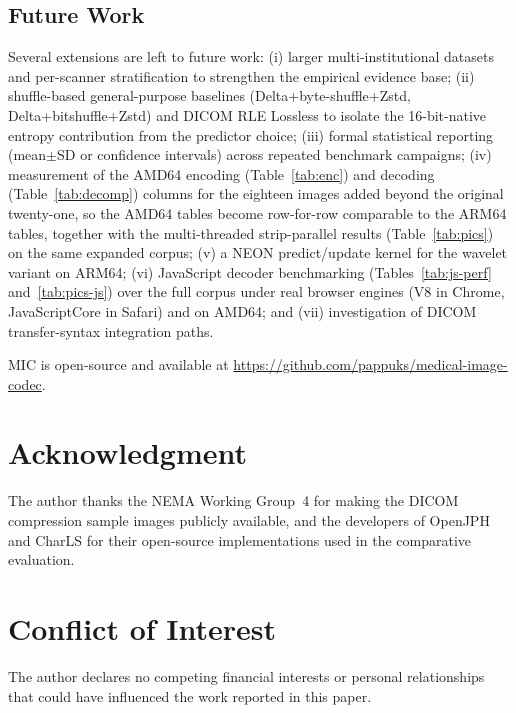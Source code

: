\documentclass[journal]{IEEEtran}
\begin{document}
\subsection{Future Work}

Several extensions are left to future work: (i) larger
multi-institutional datasets and per-scanner stratification to
strengthen the empirical evidence base; (ii) shuffle-based
general-purpose baselines (Delta+byte-shuffle+Zstd,
Delta+bitshuffle+Zstd) and DICOM RLE Lossless to isolate the
16-bit-native entropy contribution from the predictor choice; (iii)
formal statistical reporting (mean$\pm$SD or confidence intervals)
across repeated benchmark campaigns; (iv) measurement of the AMD64
encoding (Table~\ref{tab:enc}) and decoding (Table~\ref{tab:decomp})
columns for the eighteen images added beyond the original twenty-one,
so the AMD64 tables become row-for-row comparable to the ARM64 tables,
together with the multi-threaded strip-parallel results
(Table~\ref{tab:pics}) on the same expanded corpus; (v) a
NEON predict/update kernel for the wavelet variant on ARM64; (vi)
JavaScript decoder benchmarking (Tables~\ref{tab:js-perf}
and~\ref{tab:pics-js}) over the full corpus under real browser engines
(V8 in Chrome, JavaScriptCore in Safari) and on AMD64; and (vii)
investigation of DICOM transfer-syntax integration paths.

MIC is open-source and available at
\url{https://github.com/pappuks/medical-image-codec}.

\section*{Acknowledgment}

The author thanks the NEMA Working Group~4 for making the DICOM compression
sample images publicly available, and the developers of OpenJPH and CharLS for
their open-source implementations used in the comparative evaluation.

\section*{Conflict of Interest}

The author declares no competing financial interests or personal relationships
that could have influenced the work reported in this paper.

\end{document}
